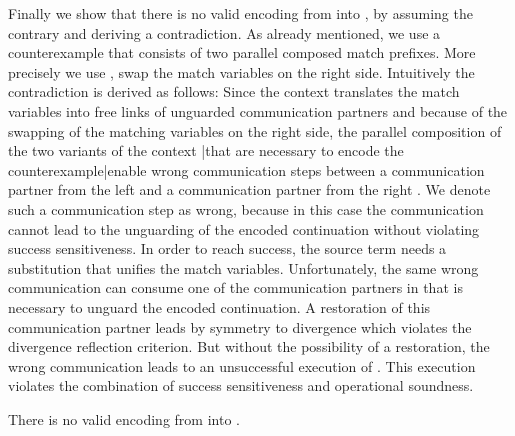 \documentclass[]{article}
\begin{document}
Finally we show that there is no valid encoding from \piT into \piNM, by assuming the contrary and deriving a contradiction. As already mentioned, we use a counterexample that consists of two parallel composed match prefixes. More precisely we use , \ie swap the match variables on the right side. Intuitively the contradiction is derived as follows: Since the context  translates the match variables into free links of unguarded communication partners and because of the swapping of the matching variables on the right side, the parallel composition of the two variants of the context |that are necessary to encode the counterexample|enable wrong communication steps between a communication partner from the left  and a communication partner from the right . We denote such a communication step as wrong, because in this case the communication cannot lead to the unguarding of the encoded continuation  without violating success sensitiveness. In order to reach success, the source term needs a substitution  that unifies the match variables. Unfortunately, the same wrong communication can consume one of the communication partners in  that is necessary to unguard the encoded continuation. A restoration of this communication partner leads by symmetry to divergence which violates the divergence reflection criterion. But without the possibility of a restoration, the wrong communication leads to an unsuccessful execution of . This execution violates the combination of success sensitiveness and operational soundness.

\begin{theorem}
	\label{thm:noEnc}
	There is no valid encoding from \piT into \piNM.
\end{theorem}
\end{document}
